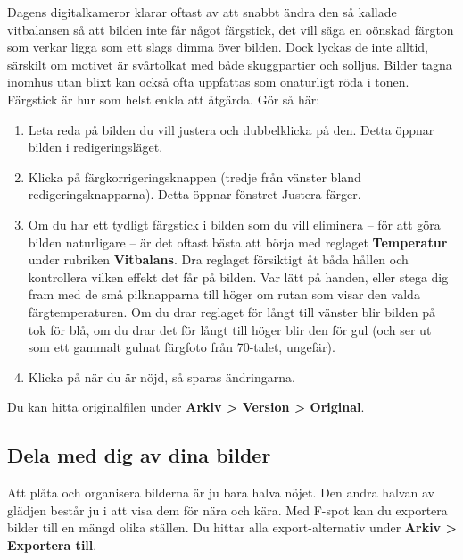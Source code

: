 \documentclass[a4paper,final]{memoir} %
\begin{document}

Dagens digitalkameror klarar oftast av att snabbt ändra den så kallade vitbalansen så att bilden inte får något färgstick, det vill säga en oönskad färgton som verkar ligga som ett slags dimma över bilden. Dock lyckas de inte alltid, särskilt om motivet är svårtolkat med både skuggpartier och solljus. Bilder tagna inomhus utan blixt kan också ofta uppfattas som onaturligt röda i tonen. Färgstick är hur som helst enkla att åtgärda. Gör så här:

\begin{enumerate}

\item Leta reda på bilden du vill justera och dubbelklicka på den. Detta öppnar bilden i redigeringsläget. 

\item Klicka på färgkorrigeringsknappen (tredje från vänster bland redigeringsknapparna). Detta öppnar fönstret Justera färger.

\item Om du har ett tydligt färgstick i bilden som du vill eliminera -- för att göra bilden naturligare -- är det oftast bästa att börja med reglaget \textbf{Temperatur} under rubriken \textbf{Vitbalans}. Dra reglaget försiktigt åt båda hållen och kontrollera vilken effekt det får på bilden. Var lätt på handen, eller stega dig fram med de små pilknapparna till höger om rutan som visar den valda färgtemperaturen. Om du drar reglaget för långt till vänster blir bilden på tok för blå, om du drar det för långt till höger blir den för gul (och ser ut som ett gammalt gulnat färgfoto från 70-talet, ungefär).

\item Klicka på \xok{} när du är nöjd, så sparas ändringarna. 

\end{enumerate}

Du kan hitta originalfilen under \textbf{Arkiv \textgreater{} Version \textgreater{} Original}.


\subsection{Dela med dig av dina bilder}


Att plåta och organisera bilderna är ju bara halva nöjet. Den andra halvan av glädjen består ju i att visa dem för nära och kära. Med F-spot kan du exportera bilder till en mängd olika ställen. Du hittar alla export-alternativ under \textbf{Arkiv \textgreater{} Exportera till}. 
\end{document}
